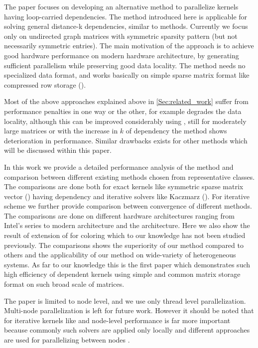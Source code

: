 The paper focuses on developing an alternative method to parallelize kernels having loop-carried dependencies. The method introduced here is applicable for solving general distance-k dependencies, similar to \MCfull methods. Currently we focus only on undirected graph \ie matrices with symmetric sparsity pattern (but not necessarily symmetric entries). The main motivation of the approach is to achieve good hardware performance on modern hardware architecture, by generating sufficient parallelism while preserving good data locality. The method needs no specialized data format, and works basically on simple sparse matrix format like compressed row storage (\CRS).

Most of the above approaches explained above in \cref{Sec:related_work} suffer from performance penalties in one way or the other, for example \MCfull degrades the data locality, although this can be improved considerably using \ABMCfull, still for moderately large matrices or with the increase in $k$ of \DK dependency the method shows deterioration in performance. Similar drawbacks exists for other methods which will be discussed within this paper.

In this work we provide a detailed performance analysis of the method and comparison between different existing methods chosen from representative classes. The comparisons are done both for exact kernels like symmetric sparse matrix vector (\SymmSpmv) having \DTWO dependency and iterative solvers like Kaczmarz (\KACZ). For iterative scheme we further provide comparison between convergence of different methods. The comparisons are done on different hardware architectures ranging from Intel's \IVB series to modern \SKX architecture and the \AMD \EPY architecture. Here we also show the result of extension of \ABMC for \DTWO coloring which to our knowledge has not been studied previously. The comparisons shows the superiority of our method compared to others and the applicability of our method on wide-variety of heterogeneous systems. As far to our knowledge this is the first paper which demonstrates such high efficiency of \DTWO dependent kernels using simple and common \CRS matrix storage format on such broad scale of matrices.

The paper is limited to node level, and we use only thread level parallelization. Multi-node parallelization is left for future work. However it should be noted that for iterative kernels like \KACZ and \GS node-level performance is far more important because commonly such solvers are applied only locally and different approaches are used for parallelizing between nodes \cite{hpcg,CARP}.

